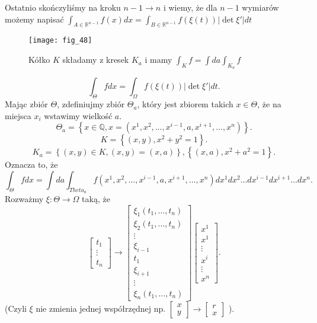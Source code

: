 \documentclass[../main.tex]{subfiles}
\begin{document}
Ostatnio skończyliśmy na kroku $n-1\to n$ i wiemy, że dla $n-1$ wymiarów możemy napisać $\int_{A\in \mathbb{R}^{n-1}}f(x)dx = \int_{B\in \mathbb{R}^{n-1}}f(\xi(t)) |\det \xi'|dt$
\begin{figure}[h]
    \centering
    \texttt{[image: fig\_48]}
    \caption{Kółko $K$ składamy z kresek $K_a$ i mamy $\int_K f = \int da \int_{K_a} f$}
    \label{fig:fig_48}
\end{figure}
\[
    \int_{\Theta} f dx = \int_{\Omega}f(\xi(t))|\det \xi'|dt
.\]
Mając zbiór $\Theta$, zdefiniujmy zbiór $\Theta_a$, który jest zbiorem takich $x\in\Theta$, że na miejsca $x_i$ wstawimy wielkość $a$.
\[
    \Theta_a = \left\{ x\in \mathbb{Q}, x = \left( x^1,x^2,\ldots,x^{i-1},a,x^{i+1},\ldots,x^n \right)  \right\}
.\]
\[
    K = \left\{ (x,y), x^2+y^2 = 1 \right\}
.\]
\[
    K_a = \left\{ (x,y)\in K, (x,y) = (x,a) \right\}, \left\{ (x,a), x^2+a^2 = 1 \right\}
.\]
Oznacza to, że
\[
    \int_\Theta f dx = \int da \int_{Theta_a}f(x^1,x^2,\ldots,x^{i-1},a,x^{i+1},\ldots,x^n) dx^1 dx^2 \ldots dx^{i-1} dx^{i+1}\ldots dx^n
.\]
Rozważmy $\xi: \Theta \to \Omega$ taką, że
\[
    \begin{bmatrix} t_1\\ \vdots \\ t_n \end{bmatrix} \to \begin{bmatrix} \xi_1(t_1,\ldots,t_n)\\ \xi_2(t_1,\ldots,t_n) \\ \vdots \\ \xi_{i-1} \\ t_1 \\ \xi_{i+1} \\ \vdots \\ \xi_n(t_1,\ldots,t_n)
\end{bmatrix} \begin{bmatrix} x^1\\x^1\\ \vdots \\ x^i \\ \vdots \\ x^n \end{bmatrix}
.\]
(Czyli $\xi$ nie zmienia jednej współrzędnej np. $\begin{bmatrix} x\\y \end{bmatrix} \to \begin{bmatrix} r\\x \end{bmatrix} $ ).\\
\end{document}

